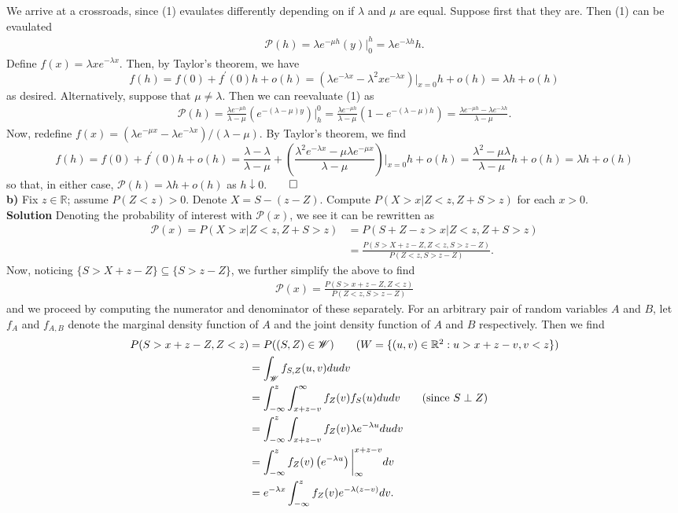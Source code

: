 \documentclass[11pt, letterpaper]{article}
\newcommand{\mbb}[1]{\mathbb{#1}}
\newcommand{\mc}[1]{\mathcal{#1}}
\begin{document}
    We arrive at a crossroads, since (1) evaulates differently depending on if $\lambda$ and $\mu$ are equal. Suppose first that they are. Then (1) can be evaulated
    \begin{align*}
        \mc{P}(h)=\lambda e^{-\mu h}(y)\bigg|^h_0=\lambda e^{-\lambda h}h.
    \end{align*}
    Define $f(x)=\lambda xe^{-\lambda x}$. Then, by Taylor's theorem, we have
    \[f(h)=f(0)+f^\prime(0)h+o(h)=(\lambda e^{-\lambda x}-\lambda^2xe^{-\lambda x})\bigg|_{x=0}h+o(h)=\lambda h+o(h)\]
    as desired. Alternatively, suppose that $\mu\neq \lambda$. Then we can reevaluate (1) as
    \begin{align*}
        \mc{P}(h)=\frac{\lambda e^{-\mu h}}{\lambda-\mu}\left(e^{-(\lambda-\mu)y}\right)\bigg|_{h}^0=\frac{\lambda e^{-\mu h}}{\lambda-\mu}\left(1-e^{-(\lambda-\mu)h}\right)=\frac{\lambda e^{-\mu h}-\lambda e^{-\lambda h}}{\lambda - \mu}.
    \end{align*}
    Now, redefine $f(x)=(\lambda e^{-\mu x}-\lambda e^{-\lambda x})/(\lambda - \mu)$. By Taylor's theorem, we find
    \[f(h)=f(0)+f^\prime(0)h+o(h)=\frac{\lambda-\lambda}{\lambda-\mu}+\left(\frac{\lambda^2 e^{-\lambda x}-\mu\lambda e^{-\mu x}}{\lambda-\mu}\right)\bigg|_{x=0}h+o(h)=\frac{\lambda^2-\mu\lambda}{\lambda-\mu}h+o(h)=\lambda h+o(h)\]
    so that, in either case, $\mc{P}(h)=\lambda h +o(h)$ as $h\downarrow 0$.\hfill{$\qed$}\\[10pt]
    {\bf b)} Fix $z\in\mbb{R}$; assume $P(Z<z)>0$. Denote $X=S-(z-Z)$. Compute $P(X>x|Z<z,Z+S>z)$ for each $x>0$.\\[10pt]
    {\bf Solution} Denoting the probability of interest with $\mc{P}(x)$, we see it can be rewritten as 
    \begin{align*}
        \mc{P}(x)=P(X>x|Z<z,Z+S>z)&=P(S+Z-z>x|Z<z,Z+S>z)\\
        &=\frac{P(S>X+z-Z,Z<z, S>z-Z)}{P(Z<z,S>z-Z)}.
    \end{align*}
    Now, noticing $\{S>X+z-Z\}\subseteq\{S>z-Z\}$, we further simplify the above to find
    \begin{align*}
        \mc{P}(x)=\frac{P(S>x+z-Z,Z<z)}{P(Z<z,S>z-Z)}
    \end{align*}
    and we proceed by computing the numerator and denominator of these separately. For an arbitrary pair of random variables $A$ and $B$, let $f_A$ and $f_{A,B}$ denote the marginal
    density function of $A$ and the joint density function of $A$ and $B$ respectively. Then we find
    \begin{align*}
        P(S>x+z-Z,Z<z)&=P((S,Z)\in\mc{W})\tag{$W=\{(u,v)\in\mbb{R}^2:u>x+z-v,v<z\}$}\\
        &=\int_{\mc{W}}f_{S,Z}(u,v)dudv\\
        &=\int_{-\infty}^z\int_{x+z-v}^\infty f_Z(v)f_S(u)dudv\tag{since $S\perp Z$}\\
        &=\int_{-\infty}^z\int_{x+z-v}f_Z(v)\lambda e^{-\lambda u}dudv\\
        &=\int_{-\infty}^zf_Z(v)\left(e^{-\lambda u}\right)\bigg|_{\infty}^{x+z-v}dv\\
        &=e^{-\lambda x}\int_{-\infty}^zf_Z(v)e^{-\lambda(z-v)}dv.
    \end{align*}
\end{document}
